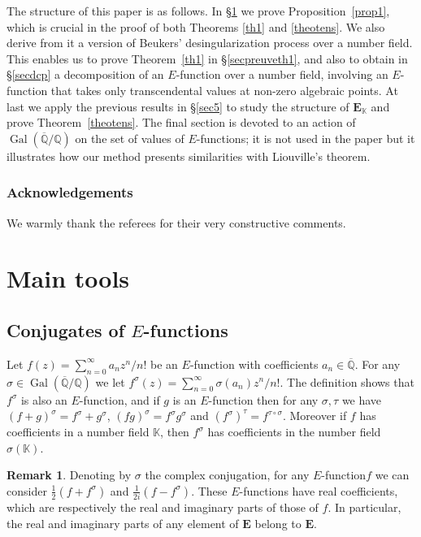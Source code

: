 \documentclass[JEP,XML,SOM,Unicode,published]{cedram}
\newcommand{\Efunction}{$E$\nobreakdash-func\-tion\xspace}
\newcommand{\Efunctions}{$E$\nobreakdash-func\-tions\xspace}
\theoremstyle{definition}
\newtheorem*{Remark*}{Remark}
\newcommand{\Q}{\mathbb{Q}}
\newcommand{\K}{\mathbb{K}}
\newcommand{\EE}{{\mathbf E}}
\newcommand{\Qbar}{\overline{\mathbb Q}}
\newcommand{\EK}{\EE_{\K}}
\DeclareMathOperator{\Gal}{Gal}
\begin{document}
The structure of this paper is as follows. In \S \ref{sec2} we prove Proposition~\ref{prop1},
which is crucial in the proof of both Theorems \ref{th1} and \ref{theotens}. We also derive from it
a version of Beukers' desingularization process over a number field. This enables us to prove Theorem~\ref{th1} in \S \ref{secpreuveth1}, and also to obtain in \S \ref{secdcp} a decomposition of an \Efunction over a number field, involving an \Efunction that takes only transcendental values at non-zero algebraic points. At last we apply the previous results in \S \ref{sec5} to study the structure of $\EK$ and prove Theorem~\ref{theotens}.
The final section is devoted to an action of $\Gal(\Qbar/\Q)$ on the set of values of \Efunctions; it is not used in the paper but it illustrates how our method presents similarities with Liouville's theorem.

\subsubsection*{Acknowledgements}
We warmly thank the referees for their very constructive comments.

\section{Main tools}\label{sec2}

\subsection{Conjugates of \Efunctions} \label{ssec:conjugates}

Let $f(z) = \sum_{n=0}^\infty a_n z^n/n!$ be an \Efunction with coefficients $a_n\in\Qbar$. For any $\sigma \in\Gal(\Qbar/\Q)$ we let $f^\sigma(z) = \sum_{n=0}^\infty \sigma(a_n) z^n/n!$. The definition shows that $f^\sigma$ is also an \Efunction, and if $g$ is an \Efunction then for any $\sigma ,\tau$ we have
$(f+g)^\sigma = f^\sigma+g^\sigma$, $ (f g)^\sigma = f^\sigma g^\sigma$ and $(f^\sigma )^\tau = f^{\tau\circ\sigma}$. Moreover if $f$ has coefficients in a number field $\K$, then $f^\sigma$ has coefficients in the number field $\sigma(\K)$.

\begin{Remark*}
Denoting by $\sigma $ the complex conjugation, for any \Efunction $f$ we can consider $\frac12(f+f^\sigma)$ and $\frac1{2i} (f-f^\sigma)$. These \Efunctions have real coefficients, which are respectively the real and imaginary parts of those of $f$. In particular, the real and imaginary parts of any element of $\EE$ belong to $\EE$.\end{Remark*}
\end{document}

